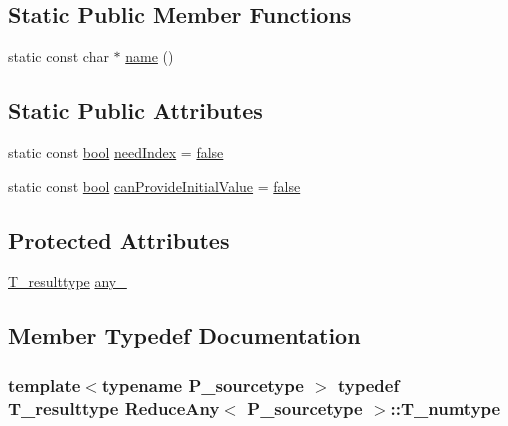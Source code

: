 \subsection*{Static Public Member Functions}
\begin{DoxyCompactItemize}
\item 
static const char $\ast$ \hyperlink{classReduceAny_a3166cede12fe3a60f118fa94f932c429}{name} ()
\end{DoxyCompactItemize}
\subsection*{Static Public Attributes}
\begin{DoxyCompactItemize}
\item 
static const \hyperlink{compiler_8h_abb452686968e48b67397da5f97445f5b}{bool} \hyperlink{classReduceAny_a6687c9a352b60aa42902a6ae04b5e272}{need\+Index} = \hyperlink{compiler_8h_a65e9886d74aaee76545e83dd09011727}{false}
\item 
static const \hyperlink{compiler_8h_abb452686968e48b67397da5f97445f5b}{bool} \hyperlink{classReduceAny_a9e5f5ff845af8eecfdb172a1f5c69200}{can\+Provide\+Initial\+Value} = \hyperlink{compiler_8h_a65e9886d74aaee76545e83dd09011727}{false}
\end{DoxyCompactItemize}
\subsection*{Protected Attributes}
\begin{DoxyCompactItemize}
\item 
\hyperlink{classReduceAny_a95a4fe59c854ec752b05800dc935362a}{T\+\_\+resulttype} \hyperlink{classReduceAny_a4d1558fa9e8d342395639157ef3e7847}{any\+\_\+}
\end{DoxyCompactItemize}


\subsection{Member Typedef Documentation}
\hypertarget{classReduceAny_af966c7bd201bbd0b89d54534afa215d0}{}
\subsubsection[{T\+\_\+numtype}]{\setlength{\rightskip}{0pt plus 5cm}template$<$typename P\+\_\+sourcetype $>$ typedef {\bf T\+\_\+resulttype} {\bf Reduce\+Any}$<$ P\+\_\+sourcetype $>$\+::{\bf T\+\_\+numtype}}\label{classReduceAny_af966c7bd201bbd0b89d54534afa215d0}
\hypertarget{classReduceAny_a95a4fe59c854ec752b05800dc935362a}{}
